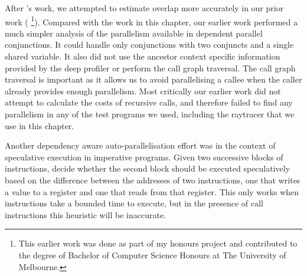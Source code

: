 After
\citeauthor{tannier:2007:parallel_mercury}'s
work,
we attempted to estimate overlap more accurately in
our prior work (\citet{bone:2008:hons}
\footnote{
    This earlier work was done as part of my honours project and contributed
    to the degree of Bachelor of Computer Science Honours at The University of
    Melbourne.}).
Compared with the work in this chapter,
our earlier work performed a much simpler analysis of the
parallelism available in dependent parallel conjunctions.
It could handle only conjunctions with two conjuncts and a single shared
variable.
It also did not use the ancestor context specific information provided by the
deep profiler or perform the call graph traversal.
The call graph traversal is important as it allows us to avoid parallelising
a callee when the caller already provides enough parallelism.
Most critically our earlier work did not attempt to calculate the costs of
recursive calls,
and therefore failed to find any parallelism in any of the test programs we
used,
including the raytracer that we use in this chapter.

Another dependency aware auto-parallelisation effort
was in the context of speculative execution in imperative programs.
Given two successive blocks of instructions,
\citet*{von_Praun:2007:implicit_parallelism_with_ordered_transactions}
decide whether the second block should be executed speculatively
based on the difference between the addresses of two instructions,
one that writes a value to a register and one that reads from that register.
This only works when instructions take a bounded time to execute,
but in the presence of call instructions
this heuristic will be inaccurate.

